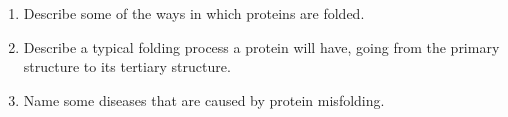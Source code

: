 \begin{enumerate}
\item Describe some of the ways in which proteins are folded.


\item Describe a typical folding process a protein will have, going from the primary structure to its tertiary structure.


\item Name some diseases that are caused by protein misfolding.


\end{enumerate}
